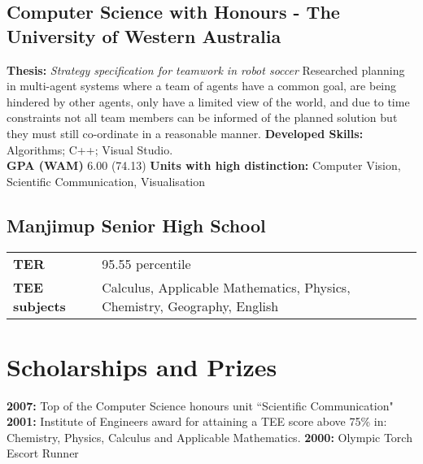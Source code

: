 \documentclass[10pt, a4paper]{report}
\begin{document}
\subsection*{Computer Science with Honours - The University of Western Australia} %
{\bf Thesis:} {\em Strategy specification for teamwork in robot soccer} \newline
Researched planning in multi-agent systems where a team of agents have a common goal, are being hindered by other agents, only have a limited view of the world, and due to time constraints not all team members can be informed of the planned solution but they must still co-ordinate in a reasonable manner. \newline
{\bf Developed Skills:} Algorithms; C{\small ++}; Visual Studio. \\
{\bf GPA (WAM)} 6.00 (74.13) \newline
{\bf Units with high distinction:} Computer Vision, Scientific Communication, Visualisation


\subsection*{Manjimup Senior High School}
\vspace{-5pt}
\begin{tabular}[h]{ll}
{\bf TER} & 95.55 percentile\\
{\bf TEE subjects} & Calculus, Applicable Mathematics, Physics, Chemistry, Geography, English\\
\end{tabular}

\vfill

\section*{Scholarships and Prizes}
{\bf 2007:} Top of the Computer Science honours unit ``Scientific Communication" \newline
{\bf 2001:} Institute of Engineers award for attaining a TEE score above 75\% in:\\
 Chemistry, Physics, Calculus and Applicable Mathematics. \newline
{\bf 2000:} Olympic Torch Escort Runner
\end{document}
